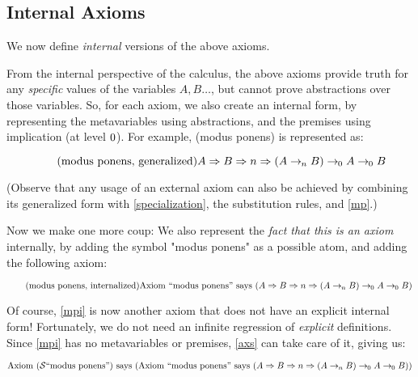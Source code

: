 \documentclass{article}
\begin{document}
  \subsection{Internal Axioms}

  We now define \emph{internal} versions of the above axioms.

  From the internal perspective of the calculus, the above axioms provide truth for any \emph{specific} values of the variables $A, B\dots$, but cannot prove abstractions over those variables.
  So, for each axiom, we also create an internal form, by representing the metavariables using abstractions, and the premises using implication (at level $0$).
  For example, (modus ponens) is represented as:

  \begin{equation*}
    \tag{modus ponens, generalized}\label{mpg}
    A \Rightarrow B \Rightarrow n \Rightarrow (A \rightarrow_{\hspace{-0.04em}n} B) \rightarrow_{\hspace{-0.04em}0} A \rightarrow_{\hspace{-0.04em}0} B
  \end{equation*}
  
  (Observe that any usage of an external axiom can also be achieved by combining its generalized form with \eqref{specialization}, the substitution rules, and \eqref{mp}.)

  Now we make one more coup: We also represent the \emph{fact that this is an axiom} internally, by adding the symbol "modus ponens" as a possible atom, and adding the following axiom:

  \begin{equation*}
    \tag{modus ponens, internalized}\label{mpi}
    \mathrm{Axiom}\ 
      \mathrm{``modus\ ponens"}\\
    \ \mathrm{says}\ 
      (A \Rightarrow B \Rightarrow n \Rightarrow (A \rightarrow_{\hspace{-0.04em}n} B) \rightarrow_{\hspace{-0.04em}0} A \rightarrow_{\hspace{-0.04em}0} B)
   \\
  \end{equation*}

  Of course, \eqref{mpi} is now another axiom that does not have an explicit internal form!
  Fortunately, we do not need an infinite regression of \emph{explicit} definitions. Since \eqref{mpi} has no metavariables or premises, \eqref{axs} can take care of it, giving us:

  \begin{equation*}
    \axiom{(\lsucc\mathrm{``modus\ ponens"})}{(
      \axiom{\mathrm{``modus\ ponens"}}{
        (\nameabst{A} \nameabst{B} \nameabst{n} (A \implies{n} B) \implies{\lzero} A \implies{\lzero} B)
      }
    )}\\
  \end{equation*}
\end{document}
